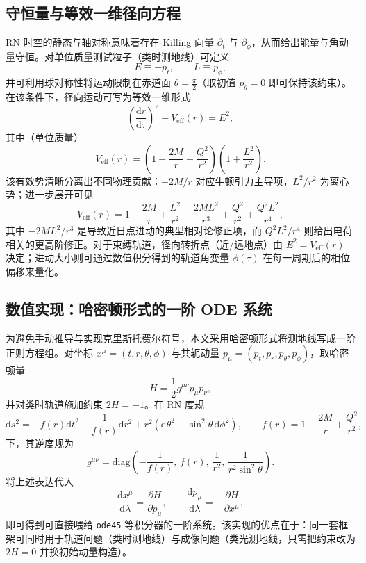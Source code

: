 \documentclass[a4paper,12pt]{article}
\begin{document}
\subsection{守恒量与等效一维径向方程}

RN 时空的静态与轴对称意味着存在 Killing 向量 $\partial_t$ 与 $\partial_\phi$，从而给出能量与角动量守恒。对单位质量测试粒子（类时测地线）可定义
\begin{equation}
E \equiv -p_t, \qquad L \equiv p_\phi,
\end{equation}
并可利用球对称性将运动限制在赤道面 $\theta=\frac{\pi}{2}$（取初值 $p_\theta=0$ 即可保持该约束）。在该条件下，径向运动可写为等效一维形式
\begin{equation}
\left(\frac{\mathrm{d}r}{\mathrm{d}\tau}\right)^2 + V_{\mathrm{eff}}(r) = E^2,
\label{eq:radial_veff}
\end{equation}
其中（单位质量）
\begin{equation}
V_{\mathrm{eff}}(r)=\left(1-\frac{2M}{r}+\frac{Q^2}{r^2}\right)\left(1+\frac{L^2}{r^2}\right).
\label{eq:veff_rn}
\end{equation}
该有效势清晰分离出不同物理贡献：$-2M/r$ 对应牛顿引力主导项，$L^2/r^2$ 为离心势；进一步展开可见
\begin{equation}
V_{\mathrm{eff}}(r)
=1-\frac{2M}{r}+\frac{L^2}{r^2}-\frac{2ML^2}{r^3}+\frac{Q^2}{r^2}+\frac{Q^2L^2}{r^4},
\end{equation}
其中 $-2ML^2/r^3$ 是导致近日点进动的典型相对论修正项，而 $Q^2L^2/r^4$ 则给出电荷相关的更高阶修正。对于束缚轨道，径向转折点（近/远地点）由 $E^2=V_{\mathrm{eff}}(r)$ 决定；进动大小则可通过数值积分得到的轨道角变量 $\phi(\tau)$ 在每一周期后的相位偏移来量化。

\subsection{数值实现：哈密顿形式的一阶 ODE 系统}

为避免手动推导与实现克里斯托费尔符号，本文采用哈密顿形式将测地线写成一阶正则方程组。对坐标 $x^\mu=(t,r,\theta,\phi)$ 与共轭动量 $p_\mu=(p_t,p_r,p_\theta,p_\phi)$，取哈密顿量
\begin{equation}
H=\frac{1}{2}g^{\mu\nu}p_\mu p_\nu,
\end{equation}
并对类时轨道施加约束 $2H=-1$。在 RN 度规
\begin{equation}
\mathrm{d}s^2=-f(r)\mathrm{d}t^2+\frac{1}{f(r)}\mathrm{d}r^2+r^2(\mathrm{d}\theta^2+\sin^2\theta\,\mathrm{d}\phi^2),\qquad
f(r)=1-\frac{2M}{r}+\frac{Q^2}{r^2},
\end{equation}
下，其逆度规为
\begin{equation}
g^{\mu\nu}=\mathrm{diag}\!\left(-\frac{1}{f(r)},\,f(r),\,\frac{1}{r^2},\,\frac{1}{r^2\sin^2\theta}\right).
\end{equation}
将上述表达代入
\begin{equation}
\frac{\mathrm{d}x^\mu}{\mathrm{d}\lambda}=\frac{\partial H}{\partial p_\mu},
\qquad
\frac{\mathrm{d}p_\mu}{\mathrm{d}\lambda}=-\frac{\partial H}{\partial x^\mu},
\end{equation}
即可得到可直接喂给 \texttt{ode45} 等积分器的一阶系统。该实现的优点在于：同一套框架可同时用于轨道问题（类时测地线）与成像问题（类光测地线，只需把约束改为 $2H=0$ 并换初始动量构造）。
\end{document}
